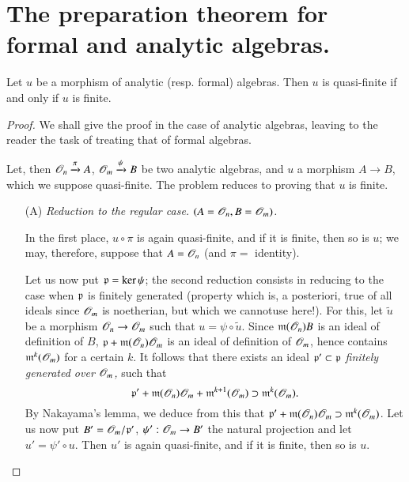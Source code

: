 \section[The preparation theorem for formal and analytic algebras]{The preparation theorem for formal and analytic algebras.}\label{chap3-sec3}

\begin{theorem}\label{chap3-thm3.1}
Let $u$ be a morphism of analytic (resp. formal) algebras. Then $u$ is quasi-finite if and only if $u$ is finite.
\end{theorem}

\begin{proof}
We shall give the proof in the case of analytic algebras, leaving to the reader the task of treating that of formal algebras.

Let, then $\mathscr{O}_{n}\xrightarrow{\pi}A$, $\mathscr{O}_{m}\xrightarrow{\psi}B$ be two analytic algebras, and $u$ a morphism $A\to B$, which we suppose quasi-finite. The problem reduces to proving that $u$ is finite.

\eject

\begin{itemize}
\item[(A)] {\em Reduction to the regular case. $(A=\mathscr{O}_{n},B=\mathscr{O}_{m})$.}

In the first place, $u\circ \pi$ is again quasi-finite, and if it is finite, then so is $u$; we may, therefore, suppose that $A=\mathscr{O}_{n}$ (and $\pi=$ identity).

Let us now put $\mathfrak{p}=\ker\psi$; the second reduction consists in reducing to the case when $\mathfrak{p}$ is finitely generated (property which is, a posteriori, true of all ideals since $\mathscr{O}_{m}$ is noetherian, but which we cannot\pageoriginale use here!). For this, let $\widetilde{u}$ be a morphism $\mathscr{O}_{n}\to \mathscr{O}_{m}$ such that $u=\psi\circ \widetilde{u}$. Since $\mathfrak{m}(\mathscr{O}_{n})B$ is an ideal of definition of $B$, $\mathfrak{p}+\mathfrak{m}(\mathscr{O}_{n})\mathscr{O}_{m}$ is an ideal of definition of $\mathscr{O}_{m}$, hence contains $\mathfrak{m}^{k}(\mathscr{O}_{m})$ for a certain $k$. It follows that there exists an ideal $\mathfrak{p}'\subset \mathfrak{p}$ {\em finitely generated over $\mathscr{O}_{m}$,} such that
$$
\mathfrak{p}'+\mathfrak{m}(\mathscr{O}_{n})\mathscr{O}_{m}+\mathfrak{m}^{k+1}(\mathscr{O}_{m})\supset \mathfrak{m}^{k}(\mathscr{O}_{m}).
$$
By Nakayama's lemma, we deduce from this that $\mathfrak{p}'+\mathfrak{m}(\mathscr{O}_{n})\mathscr{O}_{m}\supset \mathfrak{m}^{k}(\mathscr{O}_{m})$. Let us now put $B'=\mathscr{O}_{m}/\mathfrak{p}'$, $\psi':\mathscr{O}_{m}\to B'$ the natural projection and let $u'=\psi'\circ u$. Then $u'$ is again quasi-finite, and if it is finite, then so is $u$.


\end{itemize}
\end{proof}
